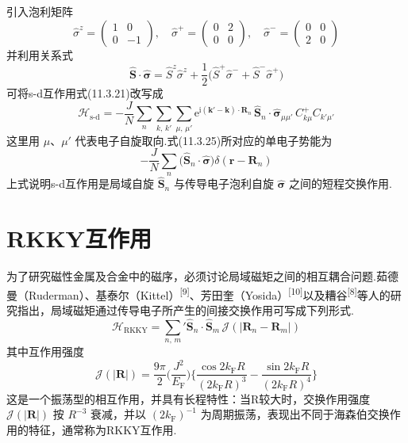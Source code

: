 引入泡利矩阵
\begin{equation}
  \hat{\sigma}^{z}=\begin{pmatrix}1&0\\0&-1\end{pmatrix},
  \quad
  \hat{\sigma}^{+}=\begin{pmatrix}0&2\\0&0\end{pmatrix},
  \quad
  \hat{\sigma}^{-}=\begin{pmatrix}0&0\\2&0\end{pmatrix}
\end{equation}
并利用关系式
\begin{equation}
  \hat{\boldsymbol{S}}\cdot\hat{\boldsymbol{\sigma}}
  =\hat{S}^{z}\hat{\sigma}^{z}
  +\frac{1}{2}\bigl(\hat{S}^{+}\hat{\sigma}^{-}
  +\hat{S}^{-}\hat{\sigma}^{+}\bigr)
\end{equation}
可将s-d互作用式(11.3.21)改写成
\begin{equation}
  \mathscr{H}_{\mathrm{s}\text{-}\mathrm{d}}
  =-\frac{J}{N}\sum_{n}\sum_{k,\,k'}\sum_{\mu,\,\mu'}
  \mathrm{e}^{\mathrm{i}(\boldsymbol{k}'-\boldsymbol{k})\cdot\boldsymbol{R}_{n}}\,
  \hat{\boldsymbol{S}}_{n}\cdot\hat{\boldsymbol{\sigma}}_{\mu\mu'}\,
  C^{+}_{k\mu}C_{k'\mu'}
\end{equation}
这里用 $\mu$、$\mu'$ 代表电子自旋取向.式(11.3.25)所对应的单电子势能为
\begin{equation}
  -\frac{J}{N}\sum_{n}
  \bigl(\hat{\boldsymbol{S}}_{n}\cdot\hat{\boldsymbol{\sigma}}\bigr)
  \delta(\boldsymbol{r}-\boldsymbol{R}_{n})
\end{equation}
上式说明s-d互作用是局域自旋 $\hat{\boldsymbol{S}}_{n}$ 与传导电子泡利自旋 $\hat{\boldsymbol{\sigma}}$ 之间的短程交换作用.

\section{RKKY互作用}

为了研究磁性金属及合金中的磁序，必须讨论局域磁矩之间的相互耦合问题.茹德曼（Ruderman）、基泰尔（Kittel）\textsuperscript{[9]}、芳田奎（Yosida）\textsuperscript{[10]}以及糟谷\textsuperscript{[8]}等人的研究指出，局域磁矩通过传导电子所产生的间接交换作用可写成下列形式.
\begin{equation}
  \mathscr{H}_{\mathrm{RKKY}}
  ={\sum_{n,\,m}}'\hat{\boldsymbol{S}}_{n}\cdot\hat{\boldsymbol{S}}_{m}\,
  \mathscr{J}(|\boldsymbol{R}_{n}-\boldsymbol{R}_{m}|)
\end{equation}
其中互作用强度
\begin{equation}
  \mathscr{J}(|\boldsymbol{R}|)=\frac{9\pi}{2}
  \biggl(\frac{J^{2}}{E_{\mathrm{F}}}\biggr)
  \biggl\{\frac{\cos 2k_{\mathrm{F}}R}{(2k_{\mathrm{F}}R)^{3}}
  -\frac{\sin 2k_{\mathrm{F}}R}{(2k_{\mathrm{F}}R)^{4}}\biggr\}
\end{equation}
这是一个振荡型的相互作用，并具有长程特性：当R较大时，交换作用强度 $\mathscr{J}(|\boldsymbol{R}|)$ 按 $R^{-3}$ 衰减，并以 $(2k_{\mathrm{F}})^{-1}$ 为周期振荡，表现出不同于海森伯交换作用的特征，通常称为RKKY互作用.


